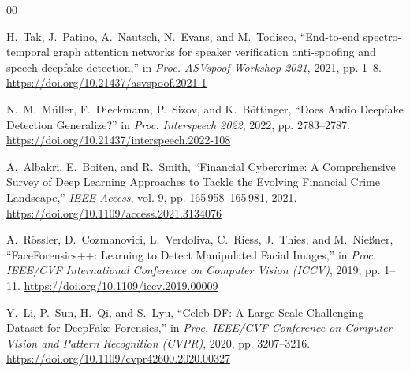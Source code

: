 \documentclass[10pt,journal,compsoc]{IEEEtran}
\begin{document}
\begin{thebibliography}{00}

H.~Tak, J.~Patino, A.~Nautsch, N.~Evans, and M.~Todisco,
``End-to-end spectro-temporal graph attention networks for speaker verification anti-spoofing and speech deepfake detection,''
in \emph{Proc. ASVspoof Workshop 2021}, 2021, pp. 1--8. \url{https://doi.org/10.21437/asvspoof.2021-1}

N.~M.~M{\"u}ller, F.~Dieckmann, P.~Sizov, and K.~B{\"o}ttinger,
``Does Audio Deepfake Detection Generalize?''
in \emph{Proc. Interspeech 2022}, 2022, pp. 2783--2787. \url{https://doi.org/10.21437/interspeech.2022-108}

A.~Albakri, E.~Boiten, and R.~Smith,
``Financial Cybercrime: A Comprehensive Survey of Deep Learning Approaches to Tackle the Evolving Financial Crime Landscape,''
\emph{IEEE Access}, vol. 9, pp. 165\,958--165\,981, 2021. \url{https://doi.org/10.1109/access.2021.3134076}

A.~R{\"o}ssler, D.~Cozmanovici, L.~Verdoliva, C.~Riess, J.~Thies, and M.~Nie{\ss}ner,
``FaceForensics++: Learning to Detect Manipulated Facial Images,''
in \emph{Proc. IEEE/CVF International Conference on Computer Vision (ICCV)}, 2019, pp. 1--11. \url{https://doi.org/10.1109/iccv.2019.00009}

Y.~Li, P.~Sun, H.~Qi, and S.~Lyu,
``Celeb-DF: A Large-Scale Challenging Dataset for DeepFake Forensics,''
in \emph{Proc. IEEE/CVF Conference on Computer Vision and Pattern Recognition (CVPR)}, 2020, pp. 3207--3216. \url{https://doi.org/10.1109/cvpr42600.2020.00327}

\end{thebibliography}
\end{document}
